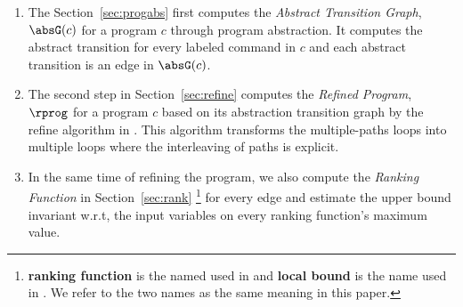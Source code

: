 \begin{enumerate}
\item  The Section~\ref{sec:progabs} first 
computes the \emph{Abstract Transition Graph}, $\absG(c)$ for a program $c$ through program abstraction.
It computes the abstract transition 
for every labeled command in $c$ and each abstract transition is an edge in $\absG(c)$.
\item The second step in Section~\ref{sec:refine}
computes the \emph{Refined Program}, $\rprog$ for a program $c$ based on 
its abstraction transition graph by the refine algorithm in \cite{GulwaniJK09}.
This algorithm transforms the multiple-paths loops
into multiple loops where
the interleaving of paths is explicit.
\item In the same time of refining the program, we also compute the \emph{Ranking Function} in Section~\ref{sec:rank}
\footnote{\textbf{ranking function} is the named used in \cite{SinnZV14}
and \textbf{local bound} is the name used in \cite{ZulegerGSV11,SinnZV17}.
We refer to the two names as the same meaning in this paper.}  
for every edge 
and estimate the upper bound invariant w.r.t, the input variables on every ranking function's maximum value.


\end{enumerate}
